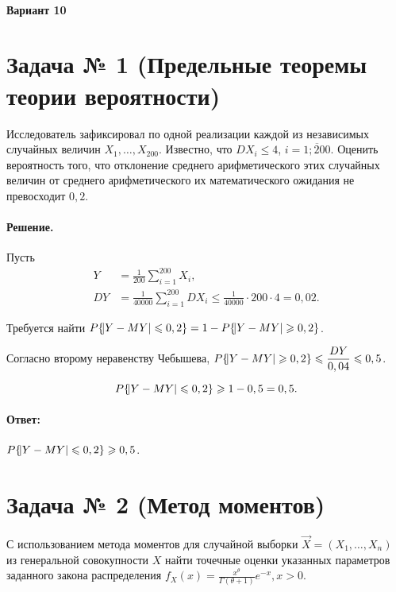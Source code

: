 \documentclass[a4paper,oneside,12pt]{extreport}
\begin{document}


\paragraph*{Вариант 10}

\section*{Задача № 1 (Предельные теоремы теории вероятности)}

Исследователь зафиксировал по одной реализации каждой из независимых случайных величин $X_1, \ldots, X_{200}$.
Известно, что $DX_i \leqslant 4$, $i = \overline{1;200}$.
Оценить вероятность того, что отклонение среднего арифметического этих случайных величин от среднего арифметического их математического ожидания не превосходит $0,2$.

\paragraph{Решение.}
Пусть
\begin{align*}
	Y &= \frac{1}{200}\sum_{i=1}^{200}X_i, \\
	DY &= \frac{1}{40000}\sum_{i=1}^{200}DX_i \leqslant \frac{1}{40000} \cdot 200 \cdot 4 = 0,02.
\end{align*}

Требуется найти $P\{\abs{Y - MY} \leqslant 0,2\} = 1 - P\{\abs{Y- MY} \geqslant 0,2\}$.

Согласно второму неравенству Чебышева, $\displaystyle P\{\abs{Y- MY} \geqslant 0,2\} \leqslant \frac{DY}{0,04} \leqslant 0,5$.

\begin{equation*}
	P\{\abs{Y- MY} \leqslant 0,2\} \geqslant 1 - 0,5 = 0,5.
\end{equation*}

\paragraph{Ответ:} $P\{\abs{Y- MY} \leqslant 0,2\} \geqslant 0,5$.

\pagebreak
\section*{Задача № 2 (Метод моментов)}

С использованием метода моментов для случайной выборки $\vec X = (X_1, \ldots, X_n)$ из генеральной совокупности $X$ найти точечные оценки указанных параметров заданного закона распределения $\displaystyle f_X(x) = \frac{x^\theta}{\Gamma(\theta + 1)}e^{-x}, x>0$.
\end{document}
